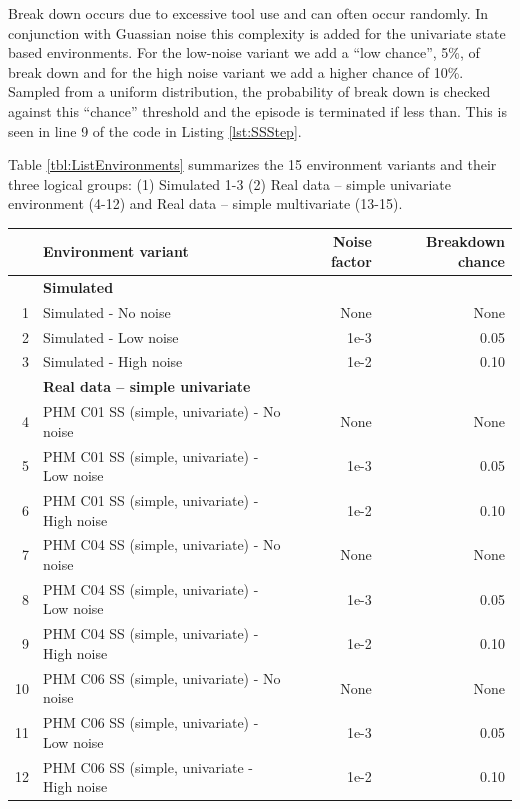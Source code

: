 \documentclass[a4paper, 12pt]{article}
\newcommand{\rowspace}[1]{\renewcommand{\arraystretch}{#1}}
\begin{document}
Break down occurs due to excessive tool use and can often occur randomly. In conjunction with Guassian noise this complexity is added for the univariate state based environments. For the low-noise variant we add a ``low chance'', 5\%, of break down and for the high noise variant we add a higher chance of 10\%. Sampled from a uniform distribution, the probability of break down is checked against this ``chance'' threshold and the episode is terminated if less than. This is seen in line 9 of the code in Listing \ref{lst:SSStep}. 

Table \ref{tbl:ListEnvironments} summarizes the 15 environment variants and their three logical groups: (1) Simulated 1-3 (2) Real data -- simple univariate environment (4-12) and Real data -- simple multivariate (13-15).

\begin{table}
	\sffamily
	\rowspace{1.3}
	\begin{tabular}{@{}r l rr@{}} \arrayrulecolor{black!40}\toprule 
		 & Environment variant & Noise factor & Breakdown chance \\ \midrule
		 & \multicolumn{3}{l}{\textbf{Simulated}}\\
		1 & Simulated - No noise  & None & None \\
		2 & Simulated - Low noise & 1e-3 & 0.05 \\
		3 & Simulated  - High noise & 1e-2 & 0.10 \\ \midrule
		\rule{0pt}{1.5\normalbaselineskip}
		 & \multicolumn{3}{l}{\textbf{Real data -- simple univariate}} \\
		4 & PHM C01 SS (simple, univariate) - No noise & None & None \\
		5 & PHM C01 SS (simple, univariate) - Low noise & 1e-3 & 0.05 \\
		6 & PHM C01 SS (simple, univariate) - High noise & 1e-2 & 0.10 \\ \hdashline
		
		7 & PHM C04 SS (simple, univariate) - No noise & None & None \\
		8 & PHM C04 SS (simple, univariate) - Low noise & 1e-3 & 0.05 \\
		9 & PHM C04 SS (simple, univariate) - High noise & 1e-2 & 0.10 \\ \hdashline
		
		10 & PHM C06 SS (simple, univariate) - No noise & None & None \\
		11 & PHM C06 SS (simple, univariate) - Low noise & 1e-3 & 0.05 \\
		12 & PHM C06 SS (simple, univariate - High noise & 1e-2 & 0.10 \\ \midrule
		

\end{tabular}
\end{table}
\end{document}
